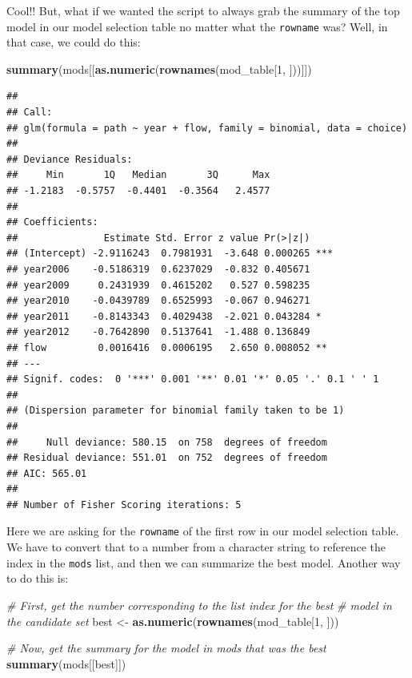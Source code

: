 \documentclass[
]{book}
\newenvironment{Shaded}{\begin{snugshade}}{\end{snugshade}}
\newcommand{\CommentTok}[1]{\textcolor[rgb]{0.56,0.35,0.01}{\textit{#1}}}
\newcommand{\DecValTok}[1]{\textcolor[rgb]{0.00,0.00,0.81}{#1}}
\newcommand{\KeywordTok}[1]{\textcolor[rgb]{0.13,0.29,0.53}{\textbf{#1}}}
\newcommand{\NormalTok}[1]{#1}
\newcommand{\StringTok}[1]{\textcolor[rgb]{0.31,0.60,0.02}{#1}}
\begin{document}
Cool!! But, what if we wanted the script to always grab the summary of the top model in our model selection table no matter what the \texttt{rowname} was? Well, in that case, we could do this:

\begin{Shaded}
\begin{Highlighting}[]
\KeywordTok{summary}\NormalTok{(mods[[}\KeywordTok{as.numeric}\NormalTok{(}\KeywordTok{rownames}\NormalTok{(mod_table[}\DecValTok{1}\NormalTok{, ]))]])}
\end{Highlighting}
\end{Shaded}

\begin{verbatim}
## 
## Call:
## glm(formula = path ~ year + flow, family = binomial, data = choice)
## 
## Deviance Residuals: 
##     Min       1Q   Median       3Q      Max  
## -1.2183  -0.5757  -0.4401  -0.3564   2.4577  
## 
## Coefficients:
##               Estimate Std. Error z value Pr(>|z|)    
## (Intercept) -2.9116243  0.7981931  -3.648 0.000265 ***
## year2006    -0.5186319  0.6237029  -0.832 0.405671    
## year2009     0.2431939  0.4615202   0.527 0.598235    
## year2010    -0.0439789  0.6525993  -0.067 0.946271    
## year2011    -0.8143343  0.4029438  -2.021 0.043284 *  
## year2012    -0.7642890  0.5137641  -1.488 0.136849    
## flow         0.0016416  0.0006195   2.650 0.008052 ** 
## ---
## Signif. codes:  0 '***' 0.001 '**' 0.01 '*' 0.05 '.' 0.1 ' ' 1
## 
## (Dispersion parameter for binomial family taken to be 1)
## 
##     Null deviance: 580.15  on 758  degrees of freedom
## Residual deviance: 551.01  on 752  degrees of freedom
## AIC: 565.01
## 
## Number of Fisher Scoring iterations: 5
\end{verbatim}

Here we are asking for the \texttt{rowname} of the first row in our model selection table. We have to convert that to a number from a character string to reference the index in the \texttt{mods} list, and then we can summarize the best model. Another way to do this is:

\begin{Shaded}
\begin{Highlighting}[]
\CommentTok{# First, get the number corresponding to the list index for the best}
\CommentTok{# model in the candidate set}
\NormalTok{best <-}\StringTok{ }\KeywordTok{as.numeric}\NormalTok{(}\KeywordTok{rownames}\NormalTok{(mod_table[}\DecValTok{1}\NormalTok{, ]))}

\CommentTok{# Now, get the summary for the model in mods that was the best}
\KeywordTok{summary}\NormalTok{(mods[[best]])}
\end{Highlighting}
\end{Shaded}
\end{document}
